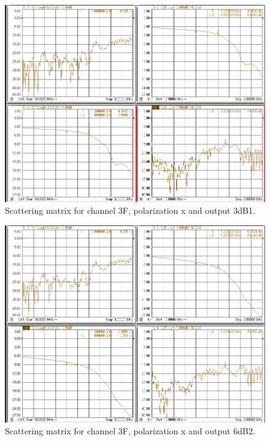 \documentclass[12pt,a4paper,oneside]{article}
\begin{document}
\begin{figure}[H]
\centering
\includegraphics[width=0.9\linewidth]{VNA_results/3Fx_3dB1.png}
\caption{Scattering matrix for channel 3F, polarization x and output 3dB1.}
\label{fig:3Fx_3dB1}
\end{figure}


\begin{figure}[H]
\centering
\includegraphics[width=0.9\linewidth]{VNA_results/3Fx_6dB2.png}
\caption{Scattering matrix for channel 3F, polarization x and output 6dB2.}
\label{fig:3Fx_6dB2}
\end{figure}
\end{document}
